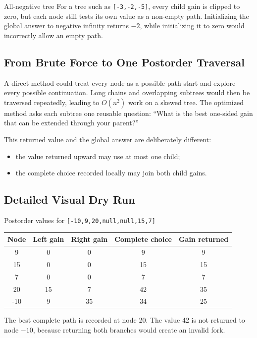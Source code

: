 \begin{conceptbox}{All-negative tree}
For a tree such as \texttt{[-3,-2,-5]}, every child gain is clipped to zero,
but each node still tests its own value as a non-empty path. Initializing the
global answer to negative infinity returns \(-2\), while
initializing it to zero would incorrectly allow an empty path.
\end{conceptbox}

\subsection{From Brute Force to One Postorder Traversal}
A direct method could treat every node as a possible path start and explore
every possible continuation. Long chains and overlapping subtrees would then
be traversed repeatedly, leading to \(O(n^2)\) work on a skewed tree. The
optimized method asks each subtree one reusable question: ``What is the best
one-sided gain that can be extended through your parent?''

This returned value and the global answer are deliberately different:
\begin{itemize}
  \item the value returned upward may use at most one child;
  \item the complete choice recorded locally may join both child gains.
\end{itemize}

\subsection{Detailed Visual Dry Run}
\begin{dryrunbox}{Postorder values for \texttt{[-10,9,20,null,null,15,7]}}
\begin{center}
\begin{tabular}{@{}c c c c c@{}}
\toprule
Node & Left gain & Right gain & Complete choice & Gain returned \\
\midrule
9 & 0 & 0 & 9 & 9 \\
15 & 0 & 0 & 15 & 15 \\
7 & 0 & 0 & 7 & 7 \\
20 & 15 & 7 & 42 & 35 \\
-10 & 9 & 35 & 34 & 25 \\
\bottomrule
\end{tabular}
\end{center}
The best complete path is recorded at node 20. The value 42 is not returned to
node \(-10\), because returning both branches would create an invalid fork.
\end{dryrunbox}

